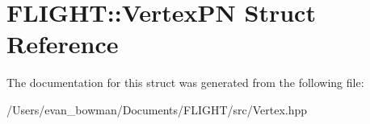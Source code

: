\hypertarget{struct_f_l_i_g_h_t_1_1_vertex_p_n}{}\section{F\+L\+I\+G\+HT\+:\+:Vertex\+PN Struct Reference}
\label{struct_f_l_i_g_h_t_1_1_vertex_p_n}


The documentation for this struct was generated from the following file\+:\begin{DoxyCompactItemize}
\item 
/\+Users/evan\+\_\+bowman/\+Documents/\+F\+L\+I\+G\+H\+T/src/Vertex.\+hpp\end{DoxyCompactItemize}
